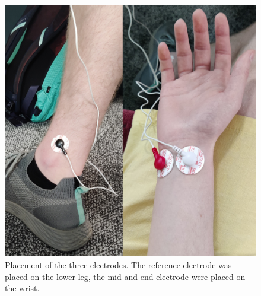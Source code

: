 \begin{figure}[ht]
    \centering
    \includegraphics[width=0.9\columnwidth]{images/hand_and_reference_electrode.jpg}
    \caption{Placement of the three electrodes. The reference electrode was placed on the lower leg, the mid and end electrode were placed on the wrist.}
    \label{fig:elec_placement}
\end{figure}


